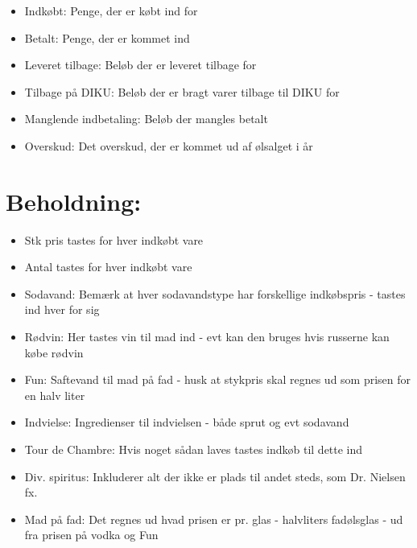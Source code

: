 \documentclass[11pt]{article} %
\begin{document}
\begin{itemize}

\item Indkøbt: Penge, der er købt ind for

\item Betalt: Penge, der er kommet ind

\item Leveret tilbage: Beløb der er leveret tilbage for

\item Tilbage på DIKU: Beløb der er bragt varer tilbage til DIKU for

\item Manglende indbetaling: Beløb der mangles betalt

\item Overskud: Det overskud, der er kommet ud af ølsalget i år

\end{itemize}

\section*{Beholdning:}

\begin{itemize}

\item Stk pris tastes for hver indkøbt vare

\item Antal tastes for hver indkøbt vare

\item Sodavand: Bemærk at hver sodavandstype har forskellige indkøbspris - tastes ind hver for sig

\item Rødvin: Her tastes vin til mad ind - evt kan den bruges hvis russerne kan købe rødvin

\item Fun: Saftevand til mad på fad - husk at stykpris skal regnes ud som prisen for en halv liter

\item Indvielse: Ingredienser til indvielsen - både sprut og evt sodavand

\item Tour de Chambre: Hvis noget sådan laves tastes indkøb til dette ind

\item Div. spiritus: Inkluderer alt der ikke er plads til andet steds, som Dr. Nielsen fx.

\item Mad på fad: Det regnes ud hvad prisen er pr. glas - halvliters fadølsglas - ud fra prisen på vodka og Fun

\end{itemize}
\end{document}

